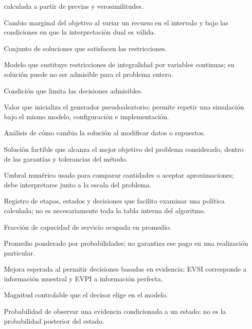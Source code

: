 \begin{description}
 calculada a partir de previas y verosimilitudes.
 \item[Precio sombra] Cambio marginal del objetivo al variar un recurso en el
 intervalo y bajo las condiciones en que la interpretación dual es válida.
 \item[Región factible] Conjunto de soluciones que satisfacen las restricciones.
 \item[Relajación lineal] Modelo que sustituye restricciones de integralidad
 por variables continuas; su solución puede no ser admisible para el problema entero.
 \item[Restricción] Condición que limita las decisiones admisibles.
 \item[Semilla] Valor que inicializa el generador pseudoaleatorio; permite
 repetir una simulación bajo el mismo modelo, configuración e implementación.
 \item[Sensibilidad] Análisis de cómo cambia la solución al modificar datos o supuestos.
 \item[Solución óptima] Solución factible que alcanza el mejor objetivo del
 problema considerado, dentro de las garantías y tolerancias del método.
 \item[Tolerancia] Umbral numérico usado para comparar cantidades o aceptar
 aproximaciones; debe interpretarse junto a la escala del problema.
 \item[Traza] Registro de etapas, estados y decisiones que facilita examinar
 una política calculada; no es necesariamente toda la tabla interna del algoritmo.
 \item[Utilización] Fracción de capacidad de servicio ocupada en promedio.
 \item[Valor esperado] Promedio ponderado por probabilidades; no garantiza ese
 pago en una realización particular.
 \item[Valor de información] Mejora esperada al permitir decisiones basadas en
 evidencia; EVSI corresponde a información muestral y EVPI a información perfecta.
 \item[Variable de decisión] Magnitud controlable que el decisor elige en el modelo.
 \item[Verosimilitud] Probabilidad de observar una evidencia condicionada a un
 estado; no es la probabilidad posterior del estado.
\end{description}
